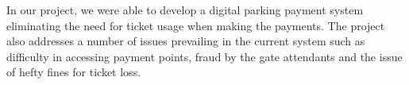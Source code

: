 In our project, we were able to develop a digital parking payment system eliminating the need for ticket usage when making the payments. The project also addresses a number of issues prevailing in the current system such as difficulty in accessing payment points, fraud by the gate attendants and the issue of hefty fines for ticket loss.
